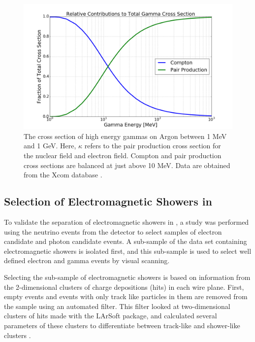 \begin{figure}[ht!]
  \includegraphics[width=\textwidth]{emshower_figures/relative_photonCrossSection.png}
  \caption[Comparison of Compton to Pair Production Cross Section]{\label{fig:relative_gamma_xsec} The cross section of high energy gammas on Argon between 1 MeV and 1 GeV.  Here, $\kappa$ refers to the pair production cross section for the nuclear field and electron field.  Compton and pair production cross sections are balanced at just above 10 MeV.  Data are obtained from the Xcom database \cite{Xcom}.}
\end{figure}


\subsection{Selection of Electromagnetic Showers in \argoneut}

To validate the separation of electromagnetic showers in \lartpcs, a study was performed using the neutrino events from the \argoneut detector to select samples of electron candidate and photon candidate events.  A sub-sample of the \argoneut data set containing electromagnetic showers is isolated first, and this sub-sample is used to select well defined electron and gamma events by visual scanning.

Selecting the sub-sample of electromagnetic showers is based on information from the 2-dimensional clusters of charge depositions (hits) in each wire plane. First, empty events and events with only track like particles in them are removed from the sample using an automated filter. This filter looked at two-dimensional clusters of hits made with the LArSoft package, and calculated several parameters of these clusters to differentiate between track-like and shower-like clusters \cite{Church:2013hea}. 

